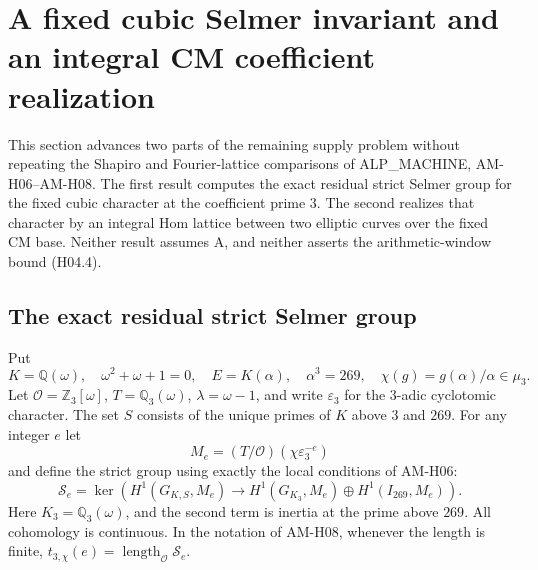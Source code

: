 \section{A fixed cubic Selmer invariant and an integral CM coefficient realization}
\label{sec:cm-twisted-selmer}

This section advances two parts of the remaining supply problem without
repeating the Shapiro and Fourier-lattice comparisons of ALP\_MACHINE,
AM-H06--AM-H08.  The first result computes the exact residual strict
Selmer group for the fixed cubic character at the coefficient prime
$3$.  The second realizes that character by an integral Hom lattice
between two elliptic curves over the fixed CM base.  Neither result
assumes A, and neither asserts the arithmetic-window bound (H04.4).

\subsection{The exact residual strict Selmer group}

Put
\[
 K=\mathbb Q(\omega),\quad \omega^2+\omega+1=0,\quad
 E=K(\alpha),\quad \alpha^3=269,\quad
 \chi(g)=g(\alpha)/\alpha\in\mu_3.
\]
Let $\mathcal O=\mathbb Z_3[\omega]$, $T=\mathbb Q_3(\omega)$,
$\lambda=\omega-1$, and write $\varepsilon_3$ for the $3$-adic
cyclotomic character.  The set $S$ consists of the unique primes of
$K$ above $3$ and $269$.  For any integer $e$ let
\[
 M_e=(T/\mathcal O)(\chi\varepsilon_3^{-e})
\]
and define the strict group using exactly the local conditions of
AM-H06:
\[
 \mathcal S_e=\ker\left(
 H^1(G_{K,S},M_e)\longrightarrow
 H^1(G_{K_3},M_e)\oplus H^1(I_{269},M_e)\right).
\]
Here $K_3=\mathbb Q_3(\omega)$, and the second term is inertia at the
prime above $269$.  All cohomology is continuous.  In the notation of
AM-H08, whenever the length is finite,
$t_{3,\chi}(e)=\operatorname{length}_{\mathcal O}\mathcal S_e$.

